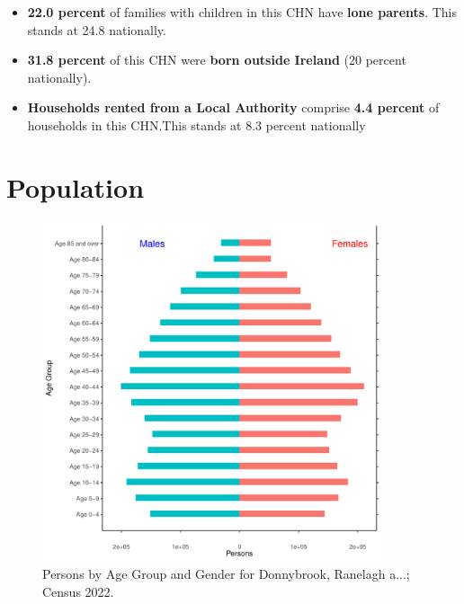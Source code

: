 \documentclass{article}
\begin{document}
\begin{itemize}
\item \textbf{22.0 percent} of families with children in this CHN have \textbf{lone parents}. This stands at 24.8 nationally.

\item \textbf{31.8 percent} of this CHN were \textbf{born outside Ireland} (20 percent nationally).

\item \textbf{Households rented from a Local Authority} comprise \textbf{4.4 percent} of households in this CHN.This stands at 8.3 percent nationally

\end{itemize}

\pagebreak

\section{Population} 
\label{sect:Pop}

\begin{figure}[h]
	\centering
	\includegraphics[width = 100mm]{../figures/PyramidPlot.pdf}
	\caption{Persons by Age Group and Gender for Donnybrook, Ranelagh a...; Census 2022.}
	\label{fig:2ae19629-1a6a-13a3-e055-000000000001}
	\end{figure}
\end{document}

